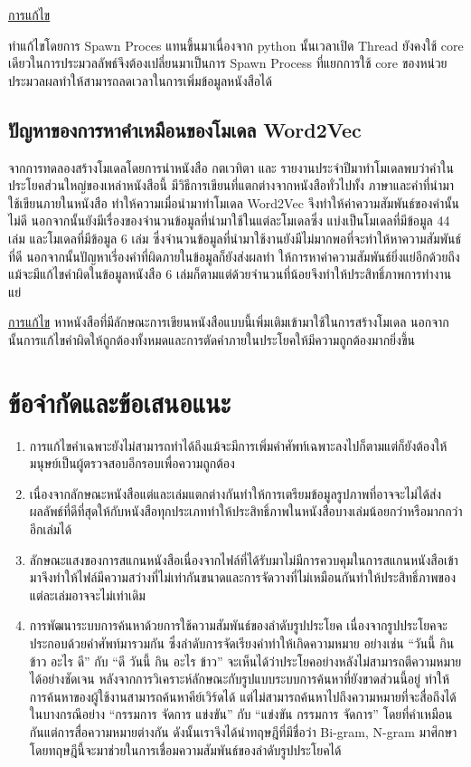 \underline{การแก้ไข}

	ทำแก้ไขโดยการ Spawn Proces แทนขึ้นมาเนื่องจาก python นั้นเวลาเปิด Thread ยังคงใช้ core เดียวในการประมวลลัพธ์จึงต้องเปลี่ยนมาเป็นการ Spawn Process ที่แยกการใช้ core ของหน่วยประมวลผลทำให้สามารถลดเวลาในการเพิ่มข้อมูลหนังสือได้

\subsection{ปัญหาของการหาคำเหมือนของโมเดล Word2Vec}

	จากการทดลองสร้างโมเดลโดยการนำหนังสือ กตเวทิตา และ รายงานประจำปีมาทำโมเดลพบว่าคำในประโยคส่วนใหญ่ของเหล่าหนังสือนี้ มีวิธีการเขียนที่แตกต่างจากหนังสือทั่วไปทั้ง 
	ภาษาและคำที่นำมาใช้เขียนภายในหนังสือ ทำให้ความเมื่อนำมาทำโมเดล Word2Vec จึงทำให้ค่าความสัมพันธ์ของคำนั้นไม่ดี นอกจากนั้นยังมีเรื่องของจำนวนข้อมูลที่นำมาใช้ในแต่ละโมเดลซึ่ง 
	แบ่งเป็นโมเดลที่มีข้อมูล 44 เล่ม และโมเดลที่มีข้อมูล 6 เล่ม ซึ่งจำนวนข้อมูลที่นำมาใช้งานยังมีไม่มากพอที่จะทำให้หาความสัมพันธ์ที่ดี นอกจากนั้นปัญหาเรี่องคำที่ผิดภายในข้อมูลก็ยังส่งผลทำ
	ให้การหาค่าความสัมพันธ์ยิ่งแย่อีกด้วยถึงแม้จะมีแก้ไขคำผิดในข้อมูลหนังสือ 6 เล่มก็ตามแต่ด้วยจำนวนที่น้อยจึงทำให้ประสิทธิ์ภาพการทำงานแย่

\underline{การแก้ไข}	
หาหนังสือที่มีลักษณะการเขียนหนังสือแบบนี้เพิ่มเติมเข้ามาใช้ในการสร้างโมเดล นอกจากนั้นการแก้ไขคำผิดให้ถูกต้องทั้งหมดและการตัดคำภายในประโยคให้มีความถูกต้องมากยิ่งขึ้น

\section{ข้อจำกัดและข้อเสนอแนะ}
\begin{enumerate}
    \item การแก้ไขคำเฉพาะยังไม่สามารถทำได้ถึงแม้จะมีการเพิ่มคำศัพท์เฉพาะลงไปก็ตามแต่ก็ยังต้องให้มนุษย์เป็นผู้ตรวจสอบอีกรอบเพื่อความถูกต้อง
    \item เนื่องจากลักษณะหนังสือแต่และเล่มแตกต่างกันทำให้การเตรียมข้อมูลรูปภาพที่อาจจะไม่ได้ส่งผลลัพธ์ที่ดีที่สุดให้กับหนังสือทุกประเภททำให้ประสิทธิ์ภาพในหนังสือบางเล่มน้อยกว่าหรือมากกว่าอีกเล่มได้
    \item ลักษณะแสงของการสแกนหนังสือเนื่องจากไฟล์ที่ได้รับมาไม่มีการควบคุมในการสแกนหนังสือเข้ามาจึงทำให้ไฟล์มีความสว่างที่ไม่เท่ากันขนาดและการจัดวางที่ไม่เหมือนกันทำให้ประสิทธิ์ภาพของแต่ละเล่มอาจจะไม่เท่าเดิม
    \item การพัฒนาระบบการค้นหาด้วยการใช้ความสัมพันธ์ของลำดับรูปประโยค เนื่องจากรูปประโยคจะประกอบด้วยคำศัพท์มารวมกัน ซึ่งลำดับการจัดเรียงคำทำให้เกิดความหมาย อย่างเช่น “วันนี้ กิน ข้าว อะไร ดี” กับ “ดี วันนี้ กิน อะไร ข้าว” จะเห็นได้ว่าประโยคอย่างหลังไม่สามารถตีความหมายได้อย่างชัดเจน หลังจากการวิเคราะห์ลักษณะกับรูปแบบระบบการค้นหาที่ยังขาดส่วนนี้อยู่ ทำให้การค้นหาของผู้ใช้งานสามารถค้นหาคีย์เวิร์ดได้ แต่ไม่สามารถค้นหาไปถึงความหมายที่จะสื่อถึงได้ในบางกรณีอย่าง “กรรมการ จัดการ แข่งขัน” กับ “แข่งขัน กรรมการ จัดการ” โดยที่คำเหมือนกันแต่การสื่อความหมายต่างกัน ดังนั้นเราจึงได้นำทฤษฎีที่มีชื่อว่า Bi-gram, N-gram มาศึกษาโดยทฤษฎีนี้จะมาช่วยในการเชื่อมความสัมพันธ์ของลำดับรูปประโยคได้
\end{enumerate}
